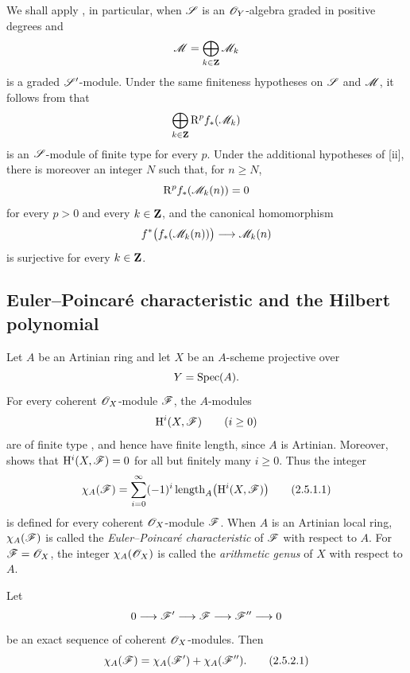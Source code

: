 \begin{env}[2.4.2]
\label{III.2.4.2}
We shall apply , in particular, when $\mathscr{S}$ is an $\mathscr{O}_Y$-algebra graded in positive degrees and
\[
  \mathscr{M}=\bigoplus_{k\in\mathbf{Z}}\mathscr{M}_k
\]
is a graded $\mathscr{S}'$-module.
Under the same finiteness hypotheses on $\mathscr{S}$ and $\mathscr{M}$, it follows from  that
\[
  \bigoplus_{k\in\mathbf{Z}}\mathrm{R}^p f_*(\mathscr{M}_k)
\]
is an $\mathscr{S}$-module of finite type for every $p$.
Under the additional hypotheses of [ii], there is moreover an integer $N$ such that, for $n\geq N$,
\[
  \mathrm{R}^p f_*(\mathscr{M}_k(n))=0
\]
for every $p>0$ and every $k\in\mathbf{Z}$, and the canonical homomorphism
\[
  f^*\bigl(f_*(\mathscr{M}_k(n))\bigr)
  \longrightarrow
  \mathscr{M}_k(n)
\]
is surjective for every $k\in\mathbf{Z}$.
\end{env}


\subsection{Euler--Poincar\'e characteristic and the Hilbert polynomial}
\label{subsection:III.2.5}

\begin{env}[2.5.1]
\label{III.2.5.1}
Let $A$ be an Artinian ring and let $X$ be an $A$-scheme projective over
\[
  Y=\operatorname{Spec}(A).
\]
For every coherent $\mathscr{O}_X$-module $\mathscr{F}$, the $A$-modules
\[
  \mathrm{H}^i(X,\mathscr{F})\qquad(i\geq0)
\]
are of finite type , and hence have finite length, since $A$ is Artinian.
Moreover,  shows that $\mathrm{H}^i(X,\mathscr{F})=0$ for all but finitely many $i\geq0$.
Thus the integer
\[
\label{III.2.5.1.1}
  \chi_A(\mathscr{F})
  =
  \sum_{i=0}^{\infty}
  (-1)^i\operatorname{length}_A\bigl(\mathrm{H}^i(X,\mathscr{F})\bigr)
  \tag{2.5.1.1}
\]
is defined for every coherent $\mathscr{O}_X$-module $\mathscr{F}$.
When $A$ is an Artinian local ring, $\chi_A(\mathscr{F})$ is called the \emph{Euler--Poincar\'e characteristic} of $\mathscr{F}$ with respect to $A$.
For $\mathscr{F}=\mathscr{O}_X$, the integer $\chi_A(\mathscr{O}_X)$ is called the \emph{arithmetic genus} of $X$ with respect to $A$.
\end{env}

\begin{proposition}[2.5.2]
\label{III.2.5.2}
Let
\[
  0\longrightarrow\mathscr{F}'
  \longrightarrow\mathscr{F}
  \longrightarrow\mathscr{F}''
  \longrightarrow0
\]
be an exact sequence of coherent $\mathscr{O}_X$-modules.
Then
\[
\label{III.2.5.2.1}
  \chi_A(\mathscr{F})
  =
  \chi_A(\mathscr{F}')+\chi_A(\mathscr{F}'').
  \tag{2.5.2.1}
\]
\end{proposition}

